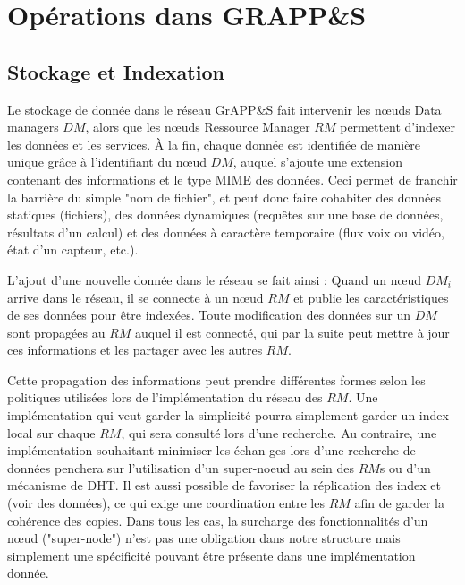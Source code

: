 \section{Opérations dans GRAPP\&S\label{SEC:OPERATIONS}}

\subsection{Stockage et Indexation}

Le stockage de donnée dans le réseau GrAPP\&S fait intervenir les n{\oe}uds Data managers $DM$, alors que les n{\oe}uds Ressource Manager $RM$ permettent d'indexer les données et les services. À la fin, chaque donnée est identifiée de manière unique grâce à l'identifiant du n{\oe}ud $DM$, auquel s'ajoute une extension contenant des informations et le type MIME des données. Ceci permet de franchir la barrière du simple "nom de fichier", et peut donc faire cohabiter des données statiques (fichiers), des données dynamiques (requêtes sur une base de données, résultats d'un calcul) et des données à caractère temporaire (flux voix ou vidéo, état d'un capteur, etc.). 

L'ajout d'une nouvelle donnée dans le réseau se fait ainsi : Quand un n{\oe}ud $DM_i$ arrive dans le réseau, il se connecte à un n{\oe}ud $RM$ et publie les caractéristiques de ses données pour être indexées. Toute modification des données sur un $DM$ sont propagées au $RM$ auquel il est connecté, qui par la suite peut mettre à jour ces informations et les partager avec les autres $RM$. 

Cette propagation des informations peut prendre différentes formes selon les politiques utilisées lors de l'implémentation du réseau des $RM$. Une implémentation qui veut garder la simplicité pourra simplement garder un index local sur chaque $RM$, qui sera consulté lors d'une recherche. Au contraire, une implémentation souhaitant minimiser les échan-ges lors d'une recherche de données penchera sur l'utilisation d'un super-noeud au sein des $RM$s ou d'un mécanisme de DHT. Il est aussi possible de favoriser la réplication des index et (voir des données), ce qui exige une coordination entre les $RM$ afin de garder la cohérence des copies. Dans tous les cas, la surcharge des fonctionnalités d'un n{\oe}ud ("super-node") n'est pas une obligation dans notre structure mais simplement une spécificité pouvant être présente dans une implémentation donnée. 

